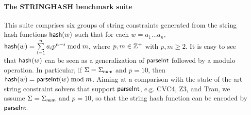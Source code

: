 \paragraph{The STRINGHASH benchmark suite} 
This suite comprises six groups of string constraints generated from the string hash functions ${\sf hash}(w)$ such that for each $w= a_1 \ldots a_n$, 
${\sf hash}(w) = \sum \limits_{i = 1}^n a_i p^{n-i} \bmod m$, where $p, m \in \mathbb{Z}^+$ with $p, m \ge 2$. It is easy to see that ${\sf hash}(w)$ can be seen as a generalization of $\textsf{parseInt}$ followed by a modulo operation. In particular, if $\Sigma = \Sigma_{\sf num}$ and $p = 10$, then ${\sf hash}(w) = \textsf{parseInt}(w) \bmod m$. 
Aiming at a comparison with the state-of-the-art string constraint solvers that support $\textsf{parseInt}$, e.g. CVC4, Z3, and Trau, we assume $\Sigma =\Sigma_{\sf num}$ and $p = 10$, so that the string hash function can be encoded by $\textsf{parseInt}$. 

